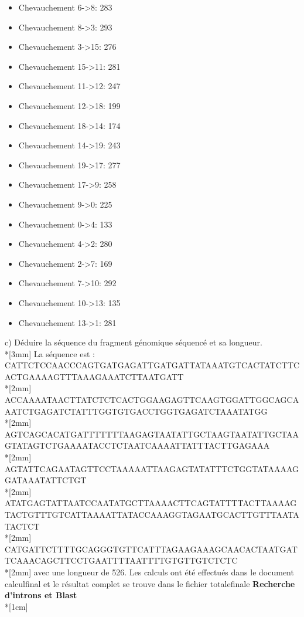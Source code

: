 \documentclass[11pt, letterpaper]{article}
\begin{document}
{\begin{itemize}
\item Chevauchement 6->8: 283
\item Chevauchement 8->3: 293
\item Chevauchement 3->15: 276
\item Chevauchement 15->11: 281
\item Chevauchement 11->12: 247
\item Chevauchement 12->18: 199
\item Chevauchement 18->14: 174
\item Chevauchement 14->19: 243
\item Chevauchement 19->17: 277
\item Chevauchement 17->9: 258
\item Chevauchement 9->0: 225
\item Chevauchement 0->4: 133
\item Chevauchement 4->2: 280
\item Chevauchement 2->7: 169
\item Chevauchement 7->10: 292
\item Chevauchement 10->13: 135
\item Chevauchement 13->1: 281
\end{itemize}
c) Déduire la séquence du fragment génomique séquencé et sa longueur. \\*[3mm]
La séquence est :  CATTCTCCAACCCAGTGATGAGATTGATGATTATAAATGTCACTATCTTCACTGAAAAGTTTAAAGAAATCTTAATGATT\\*[2mm]
ACCAAAATAACTTATCTCTCACTGGAAGAGTTCAAGTGGATTGGCAGCAAATCTGAGATCTATTTGGTGTGACCTGGTGAGATCTAAATATGG\\*[2mm]
AGTCAGCACATGATTTTTTTAAGAGTAATATTGCTAAGTAATATTGCTAAGTATAGTCTGAAAATACCTCTAATCAAAATTATTTACTTGAGAAA\\*[2mm]
AGTATTCAGAATAGTTCCTAAAAATTAAGAGTATATTTCTGGTATAAAAGGATAAATATTCTGT
\\*[2mm]
ATATGAGTATTAATCCAATATGCTTAAAACTTCAGTATTTTACTTAAAAGTACTGTTTGTCATTAAAATTATACCAAAGGTAGAATGCACTTGTTTAATATACTCT
\\*[2mm]
CATGATTCTTTTGCAGGGTGTTCATTTAGAAGAAAGCAACACTAATGATTCAAACAGCTTCCTGAATTTTAATTTTGTGTTGTCTCTC\\*[2mm]
avec une longueur de 526. Les calculs ont été effectués dans le document calculfinal et le résultat complet se trouve dans le fichier totalefinale
\newpage
\textbf{Recherche d'introns et Blast} \\*[1cm]

}
\end{document}
